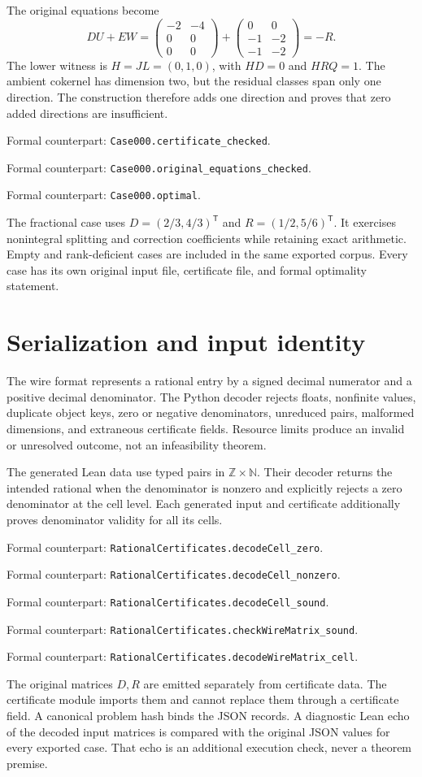 \documentclass[11pt,letterpaper,oneside,openany]{book}
\theoremstyle{quiet}
\newcommand{\Z}{\mathbb{Z}}
\newcommand{\N}{\mathbb{N}}
\newcommand{\formal}[1]{\par\nobreak\begingroup\footnotesize\color{Slate}\sffamily Formal counterpart: \normalfont\nolinkurl{#1}.\par\endgroup}
\begin{document}
The original equations become
\[
 DU+EW=
 \begin{pmatrix}-2&-4\\0&0\\0&0\end{pmatrix}+
 \begin{pmatrix}0&0\\-1&-2\\-1&-2\end{pmatrix}=-R.
\]
The lower witness is $H=JL=(0,1,0)$, with $HD=0$ and $HRQ=1$. The ambient cokernel has dimension two, but the residual classes span only one direction. The construction therefore adds one direction and proves that zero added directions are insufficient.
\formal{Case000.certificate_checked}
\formal{Case000.original_equations_checked}
\formal{Case000.optimal}

The fractional case uses $D=(2/3,4/3)^{\mathsf T}$ and $R=(1/2,5/6)^{\mathsf T}$. It exercises nonintegral splitting and correction coefficients while retaining exact arithmetic. Empty and rank-deficient cases are included in the same exported corpus. Every case has its own original input file, certificate file, and formal optimality statement.

\section{Serialization and input identity}
The wire format represents a rational entry by a signed decimal numerator and a positive decimal denominator. The Python decoder rejects floats, nonfinite values, duplicate object keys, zero or negative denominators, unreduced pairs, malformed dimensions, and extraneous certificate fields. Resource limits produce an invalid or unresolved outcome, not an infeasibility theorem.

The generated Lean data use typed pairs in $\Z\times\N$. Their decoder returns the intended rational when the denominator is nonzero and explicitly rejects a zero denominator at the cell level. Each generated input and certificate additionally proves denominator validity for all its cells.
\formal{RationalCertificates.decodeCell_zero}
\formal{RationalCertificates.decodeCell_nonzero}
\formal{RationalCertificates.decodeCell_sound}
\formal{RationalCertificates.checkWireMatrix_sound}
\formal{RationalCertificates.decodeWireMatrix_cell}

The original matrices $D,R$ are emitted separately from certificate data. The certificate module imports them and cannot replace them through a certificate field. A canonical problem hash binds the JSON records. A diagnostic Lean echo of the decoded input matrices is compared with the original JSON values for every exported case. That echo is an additional execution check, never a theorem premise.
\end{document}
